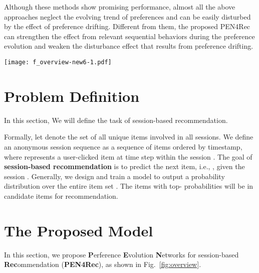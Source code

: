 \documentclass[runningheads]{llncs}
\begin{document}
Although these methods show promising performance, almost all the above approaches neglect the evolving trend of preferences and can be easily disturbed by the effect of preference drifting.
Different from them, the proposed PEN4Rec can strengthen the effect from relevant sequential behaviors during the preference evolution and weaken the disturbance effect that results from preference drifting. 






\begin{figure*}[t]
  \centering
  \texttt{[image: f\_overview-new6-1.pdf]}
  \caption{The architecture of the proposed model. PEN4Rec builds a directed session graph for each session sequence and encode items into a unified embedding space by the embedding layer. Then, in the first-stage process, irrelevant behaviors are integrated according to the last  items from historical contexts. In the second-stage process, the model retrieves diverse preferences and reasons the preference evolving trajectory that is relevant to the updated query. Finally, PEN4Rec generates a vector representation with diverse preferences to make recommendations. 
  }
  \label{fig:overview}
\end{figure*}


\section{Problem Definition}  \label{sec:task}
In this section, We will define the task of session-based recommendation. 

Formally, let  denote the set of all unique items involved in all sessions.
We define an anonymous session sequence  as a sequence of items  ordered by timestamp, where  represents a user-clicked item at time step  within the session . 
The goal of {\bf session-based recommendation} is to predict the next item, i.e., , given the session .
Generally, we design and train a model to output a probability distribution  over the entire item set .
The items with top- probabilities will be in candidate items for recommendation.


\section{The Proposed Model} \label{sec:model}
In this section, we propose {\bf P}erference {\bf E}volution {\bf N}etworks for session-based {\bf Rec}ommendation (\textbf{PEN4Rec}), as shown in Fig.~\ref{fig:overview}. 
\end{document}
